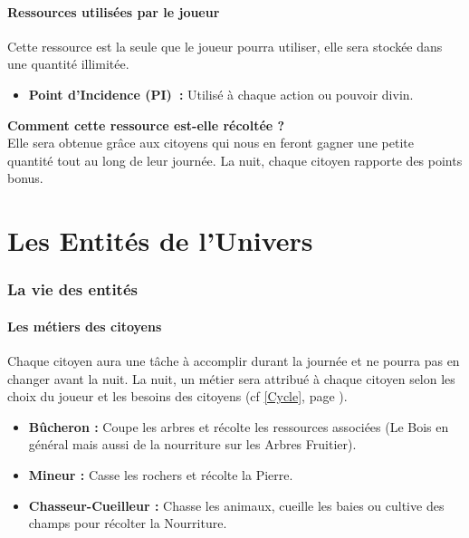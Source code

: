 \documentclass[a4paper]{article}
\begin{document}
      \subsection{Ressources utilisées par le joueur}
        Cette ressource est la seule que le joueur pourra utiliser, elle sera stockée dans une quantité illimitée.
        \begin{itemize} \small
          \item \textbf{Point d'Incidence (PI) :} Utilisé à chaque action ou pouvoir divin.
        \end{itemize} \normalsize
        \textbf{Comment cette ressource est-elle récoltée ? }\\Elle sera obtenue grâce aux citoyens qui nous en feront gagner une petite quantité tout au long de leur journée. La nuit, chaque citoyen rapporte des points bonus.


  \newpage
  \part{Les Entités de l'Univers}
    \section{La vie des entités}

      \subsection{Les métiers des citoyens}
        \label{Metier}
        Chaque citoyen aura une tâche à accomplir durant la journée et ne pourra pas en changer avant la nuit. La nuit, un métier sera attribué à chaque citoyen selon les choix du joueur et les besoins des citoyens (cf \ref{Cycle}, page \pageref{Cycle}).
        \begin{itemize} \small
          \item \textbf{Bûcheron :} Coupe les arbres et récolte les ressources associées (Le Bois en général mais aussi de la nourriture sur les Arbres Fruitier).
          \item \textbf{Mineur :} Casse les rochers et récolte la Pierre.
          \item \textbf{Chasseur-Cueilleur :} Chasse les animaux, cueille les baies ou cultive des champs pour récolter la Nourriture.
        \end{itemize} \normalsize
\end{document}
